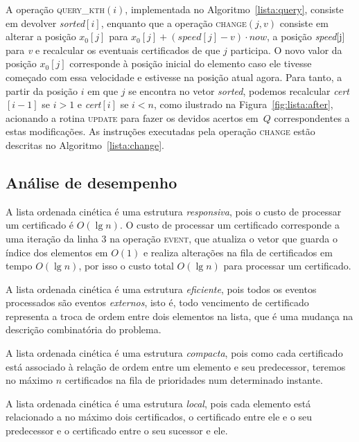 A operação \textsc{query\_kth}$(i)$, implementada no Algoritmo~\ref{lista:query}, consiste em
devolver \textit{sorted}$[i]$, enquanto que a operação \textsc{change}$(j, v)$ consiste em alterar
a posição $x_0[j]$ para $x_0[j] + (\mathit{speed}[j] - v)\cdot now$,
a posição \textit{speed}[j] para \textit{v} e recalcular os
eventuais certificados de que $j$ participa.
O novo valor da posição $x_0[j]$ corresponde à posição inicial do elemento caso ele tivesse
começado com essa velocidade e estivesse na posição atual agora.
Para tanto, a partir da posição $i$ em que $j$ se encontra no vetor
\textit{sorted}, podemos recalcular \textit{cert}$[i - 1]$ se $i >
1$ e \textit{cert}$[i]$ se $i < n$, como ilustrado na Figura~\ref{fig:lista:after}, acionando a
rotina \textsc{update} para fazer
os devidos acertos em~$Q$ correspondentes a estas modificações.
As instruções executadas pela operação \textsc{change} estão descritas
no Algoritmo~\ref{lista:change}.



\subsection{Análise de desempenho}\label{subsec:analise-de-desempenho}

A lista ordenada cinética é uma estrutura \textit{responsiva}, pois o custo de
processar um certificado é $O(\lg{n})$.
O custo de processar um certificado corresponde a uma iteração da linha $3$ na operação
\textsc{event}, que atualiza o vetor que guarda o índice dos elementos em $O(1)$ e realiza
alterações na fila de certificados em tempo $O(\lg{n})$, por isso o custo total $O(\lg{n})$ para
processar um certificado.

A lista ordenada cinética é uma estrutura \textit{eficiente}, pois todos os eventos
processados são eventos \textit{externos}, isto é, todo vencimento de
certificado representa a troca de ordem entre dois elementos na lista, que é uma
mudança na descrição combinatória do problema.

A lista ordenada cinética é uma estrutura \textit{compacta}, pois como cada
certificado está associado à relação de ordem entre um elemento e seu
predecessor, teremos no máximo $n$ certificados na fila de prioridades num
determinado instante.

A lista ordenada cinética é uma estrutura \textit{local}, pois cada elemento
está relacionado a no máximo dois certificados, o certificado entre ele e o
seu predecessor e o certificado entre o seu sucessor e ele.
